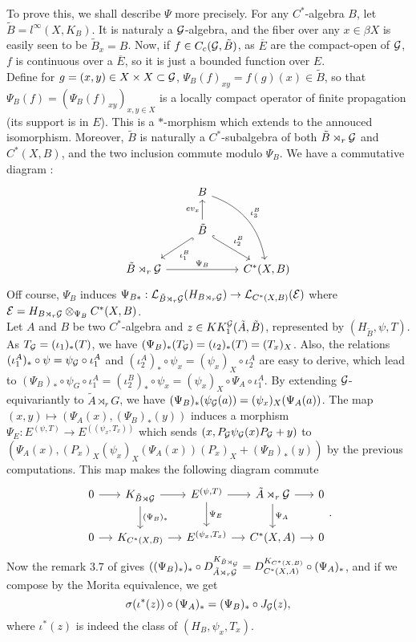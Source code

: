 \begin{itemize}
To prove this, we shall describe $\Psi$ more precisely. For any $C^*$-algebra $B$, let $\tilde B = l^\infty (X,K_B)$. It is naturaly a $\mathcal G$-algebra, and the fiber over any $x\in\beta X$ is easily seen to be $\tilde B_x = B$. Now, if $f\in C_c(\mathcal G, \tilde B)$, as $\overline E$ are the compact-open of $\mathcal G$, $f$ is continuous over a $\overline E$, so it is just a bounded function over $E$.\\
Define for $g=(x,y)\in X\times X\subset \mathcal G$,
$\Psi_B(f)_{xy}=f(g)(x)\in \tilde B$,
so that $\Psi_B(f)=(\Psi_B(f)_{xy})_{x,y\in X}$ is a locally compact operator of finite propagation (its support is in $E$). This is a $*$-morphism which extends to the annouced isomorphism. Moreover, $\tilde B$ is naturally a $C^*$-subalgebra of both $\tilde B\rtimes_r \mathcal G$ and $C^*(X,B)$, and the two inclusion commute modulo $\Psi_B$. We have a commutative diagram :
\[\begin{tikzcd} 
  \  & B \arrow[bend left]{rdd}{\iota_3^B}& \\
  \ &\tilde B \arrow{u}{ev_x}\arrow[hookrightarrow]{ld}{\iota_1^B}\arrow[hookrightarrow]{rd}{\iota_2^B} &  \\ 
\tilde B\rtimes_r\G \arrow{rr}{\Psi_B} &  &  C^*(X,B) 
\end{tikzcd}\] 
Off course, $\Psi_B$ induces $\Psi_{B*} : \mathcal L_{\tilde B\rtimes_r \mathcal G}(H_{B\rtimes_r \mathcal G})\rightarrow \mathcal L_{C^*(X,B)}(\mathcal E)$ where $\mathcal E = H_{B\rtimes_r \mathcal G}\otimes_{\Psi_B} C^*(X,B)$. \\
Let $A$ and $B$ be two $C^*$-algebra and $z\in KK_1^\mathcal G(\tilde A,\tilde B)$, represented by $(H_{\tilde B}, \psi, T)$. As $T_\mathcal G = (\iota_1)_*(T)$, we have $(\Psi_B)_*(T_\mathcal G)=(\iota_2)_*(T)=(T_x)_X$. Also, the relations $(\iota_1^A)_*\circ\psi = \psi_\mathcal G\circ \iota_1^A$ and $(\iota_2^A)_*\circ\psi_x = (\psi_x)_X\circ \iota_2^A$ are easy to derive, which lead to $(\Psi_B)_*\circ \psi_G \circ \iota_1^A= (\iota_2^B)_*\circ \psi_x = (\psi_x)_X\circ \Psi_A\circ \iota_1^A$. By extending $\mathcal G$-equivariantly to $\tilde A  \rtimes_r G$, we have $(\Psi_B)_*(\psi_\mathcal G(a))=(\psi_x)_X(\Psi_A(a))$. The map $(x,y)\mapsto (\Psi_A(x), (\Psi_B)_*(y))$ induces a morphism $\Psi_E : E^{(\psi,T)}  \rightarrow  E^{((\psi_x,T_x))}$ which sends 
$(x,P_\mathcal G \psi_\mathcal G(x)P_\mathcal G + y)$ to $(\Psi_A(x), (P_x)_X(\psi_x)_X(\Psi_A(x))(P_x)_X+(\Psi_B)_*(y))$ by the previous computations. This map makes the following diagram commute
\[
\begin{tikzcd}[column sep = small]
0\arrow{r} & K_{\tilde B\rtimes \G}\arrow{r}\arrow{d}{(\Psi_B)_*} & E^{(\psi,T)} \arrow{r}\arrow{d}{\Psi_E}& \tilde A\rtimes_r \G\arrow{r}\arrow{d}{\Psi_A} & 0\\
0\arrow{r} & K_{C^*(X,B)}\arrow{r} & E^{(\psi_x,T_x)} \arrow{r}& C^*(X,A)\arrow{r} & 0
\end{tikzcd}.
\]
Now the remark $3.7$ of \cite{OY2} gives $((\Psi_B)_*)_*\circ D_{\tilde A\rtimes_r\mathcal G}^{K_{\tilde B\rtimes_\mathcal G}} = D_{C^*(X,A)}^{K_{C^*(X,B)}}\circ (\Psi_A)_*$, and if we compose by the Morita equivalence, we get 
\[\sigma(\iota^*(z)) \circ (\Psi_A)_* = (\Psi_B)_*\circ J_\mathcal G(z),\]
where $\iota^*(z)$ is indeed the class of $(H_B, \psi_x,T_x)$.\\


\end{itemize}
